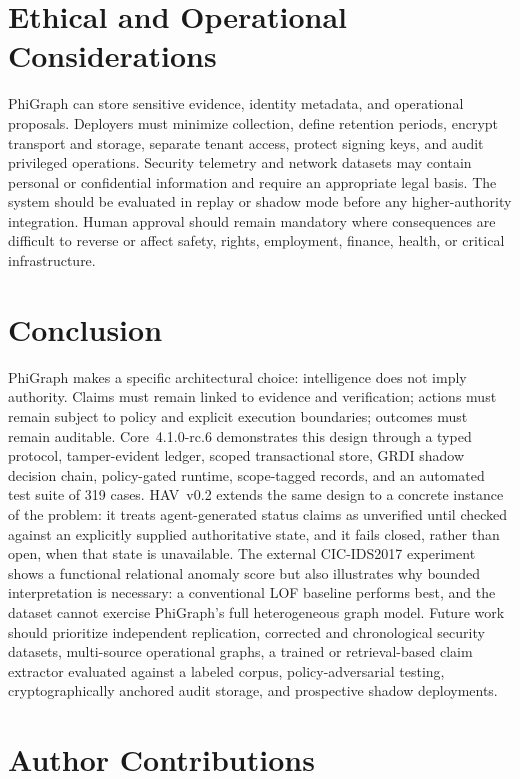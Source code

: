 \documentclass[11pt]{article}
\begin{document}
\section{Ethical and Operational Considerations}

PhiGraph can store sensitive evidence, identity metadata, and operational
proposals. Deployers must minimize collection, define retention periods,
encrypt transport and storage, separate tenant access, protect signing keys,
and audit privileged operations. Security telemetry and network datasets may
contain personal or confidential information and require an appropriate legal
basis. The system should be evaluated in replay or shadow mode before any
higher-authority integration. Human approval should remain mandatory where
consequences are difficult to reverse or affect safety, rights, employment,
finance, health, or critical infrastructure.

\section{Conclusion}

PhiGraph makes a specific architectural choice: intelligence does not imply
authority. Claims must remain linked to evidence and verification; actions must
remain subject to policy and explicit execution boundaries; outcomes must
remain auditable. Core~4.1.0-rc.6 demonstrates this design through a typed
protocol, tamper-evident ledger, scoped transactional store, GRDI shadow
decision chain, policy-gated runtime, scope-tagged records, and an automated
test suite of 319 cases. HAV~v0.2 extends the same design to a concrete
instance of the problem: it treats agent-generated status claims as unverified
until checked against an explicitly supplied authoritative state, and it fails
closed, rather than open, when that state is unavailable. The external
CIC-IDS2017 experiment shows a functional relational anomaly score but also
illustrates why bounded interpretation is necessary: a conventional LOF
baseline performs best, and the dataset cannot exercise PhiGraph's full
heterogeneous graph model. Future work should prioritize independent
replication, corrected and chronological security datasets, multi-source
operational graphs, a trained or retrieval-based claim extractor evaluated
against a labeled corpus, policy-adversarial testing, cryptographically
anchored audit storage, and prospective shadow deployments.

\section*{Author Contributions}
\end{document}
